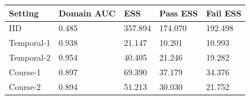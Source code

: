 \begin{tabular}{lllll}
\toprule
Setting & Domain AUC & ESS & Pass ESS & Fail ESS\\
\midrule
IID & 0.485 & 357.894 & 174.070 & 192.498\\
Temporal-1 & 0.938 & 21.147 & 10.201 & 10.993\\
Temporal-2 & 0.954 & 40.405 & 21.246 & 19.282\\
Course-1 & 0.897 & 69.390 & 37.179 & 34.376\\
Course-2 & 0.894 & 51.213 & 30.030 & 21.752\\
\bottomrule
\end{tabular}
